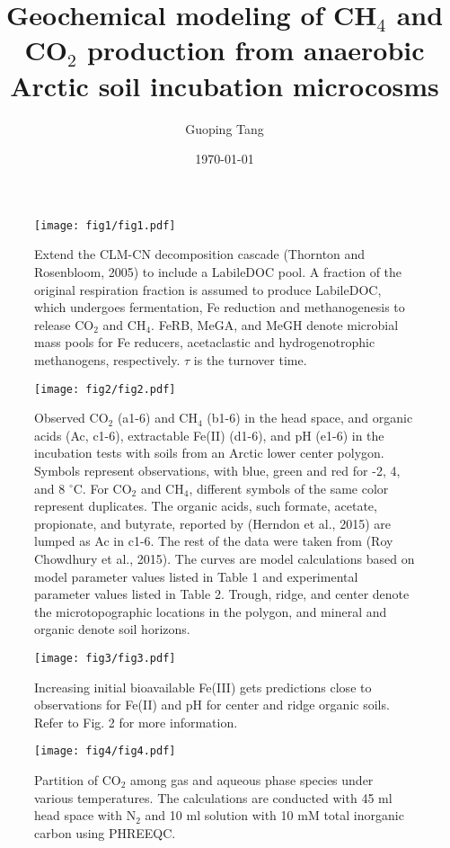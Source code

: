 \documentclass[12pt, a4paper]{article}
\title{Geochemical modeling of CH$_4$ and CO$_2$ production from anaerobic Arctic soil incubation microcosms}
\author{Guoping Tang}
\date\today{}
\begin{document}
\maketitle

\begin{abstract}
\end{abstract}

\begin{figure}
\centering
\texttt{[image: fig1/fig1.pdf]}
\caption{Extend the CLM-CN decomposition cascade (Thornton and Rosenbloom,
2005) to include a LabileDOC pool. A fraction of the original respiration fraction is assumed to
produce LabileDOC, which undergoes fermentation, Fe reduction and
methanogenesis to release CO$_2$ and CH$_4$. FeRB, MeGA, and MeGH denote microbial
mass pools for Fe reducers, acetaclastic and hydrogenotrophic methanogens,
respectively. $\tau$ is the turnover time.}
\label{fig1}
\end{figure}

\begin{figure}
\centering
\texttt{[image: fig2/fig2.pdf]}
\caption{
Observed CO$_2$ (a1-6) and CH$_4$ (b1-6) in the head space, and organic acids (Ac, c1-6),
extractable Fe(II) (d1-6), and pH (e1-6) in the incubation tests
with soils from an Arctic lower center polygon. Symbols represent
observations, with blue, green and red for -2, 4, and 8 $^{\circ}$C. For CO$_2$ and CH$_4$, different symbols of the same color represent
duplicates. The organic acids, such formate, acetate, propionate, and butyrate,
reported by (Herndon et al., 2015)  are lumped as Ac in c1-6. The rest of the
data were taken from (Roy Chowdhury et al., 2015). The curves are model
calculations based on model parameter values listed in Table 1 and experimental
parameter values listed in Table 2. Trough, ridge, and center denote the
microtopographic locations in the polygon, and mineral and organic denote soil
horizons.}
\label{fig2}
\end{figure}

\begin{figure}
\centering
\texttt{[image: fig3/fig3.pdf]}
\caption{
Increasing initial bioavailable Fe(III) gets predictions close to observations for Fe(II) and pH for center and ridge organic soils. Refer to Fig. 2 for more information.
}
\label{fig3}
\end{figure}

\begin{figure}
\centering
\texttt{[image: fig4/fig4.pdf]}
\caption{
Partition of CO$_2$ among gas and aqueous phase species under various
temperatures. The calculations are conducted with 45 ml head space with N$_2$ and
10 ml solution with 10 mM total inorganic carbon using PHREEQC. 
}
\label{fig4}
\end{figure}
\end{document}
